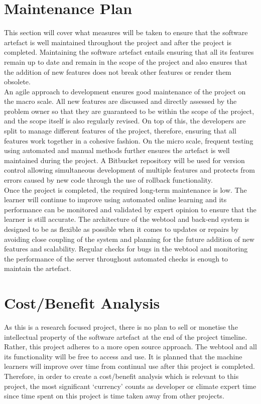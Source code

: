 \documentclass{ecmm427_assignment}
\begin{document}
\section{Maintenance Plan}
\quad This section will cover what measures will be taken to ensure that the software artefact is well maintained throughout the project and after the project is completed. Maintaining the software artefact entails ensuring that all its features remain up to date and remain in the scope of the project and also ensures that the addition of new features does not break other features or render them obsolete.\\

\quad An agile approach to development ensures good maintenance of the project on the macro scale. All new features are discussed and directly assessed by the problem owner so that they are guaranteed to be within the scope of the project, and the scope itself is also regularly revised. On top of this, the developers are split to manage different features of the project, therefore, ensuring that all features work together in a cohesive fashion. On the micro scale, frequent testing using automated and manual methods further ensures the artefact is well maintained during the project. A Bitbucket repository will be used for version control allowing simultaneous development of multiple features and protects from errors caused by new code through the use of rollback functionality.\\

\quad Once the project is completed, the required long-term maintenance is low. The learner will continue to improve using automated online learning and its performance can be monitored and validated by expert opinion to ensure that the learner is still accurate. The architecture of the webtool and back-end system is designed to be as flexible as possible when it comes to updates or repairs by avoiding close coupling of the system and planning for the future addition of new features and scalability. Regular checks for bugs in the webtool and monitoring the performance of the server throughout automated checks is enough to maintain the artefact.

\section{Cost/Benefit Analysis}
\quad As this is a research focused project, there is no plan to sell or monetise the intellectual property of the software artefact at the end of the project timeline. Rather, this project adheres to a more open source approach. The webtool and all its functionality will be free to access and use. It is planned that the machine learners will improve over time from continual use after this project is completed. Therefore, in order to create a cost/benefit analysis which is relevant to this project, the most significant ‘currency’ counts as developer or climate expert time since time spent on this project is time taken away from other projects.
\end{document}
